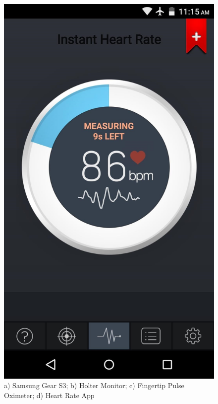 \begin{figure}[H]
	\includegraphics[scale=0.04]{images/heart_app1.jpg}
    \caption{a) Samsung Gear S3; b) Holter Monitor; c) Fingertip Pulse Oximeter; d) Heart Rate App}
    \label{fig:device_example}
\end{figure}

